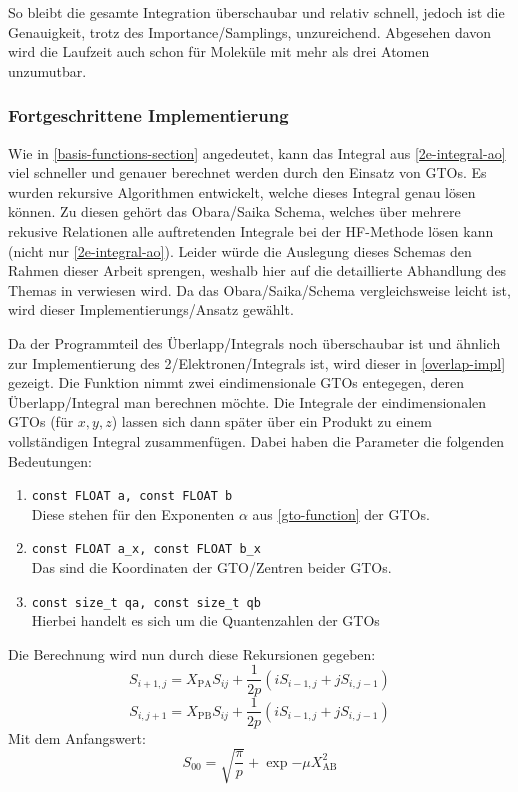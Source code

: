 So bleibt die gesamte Integration überschaubar und relativ schnell,
jedoch ist die Genauigkeit, trotz des Importance\-/Samplings, unzureichend.
Abgesehen davon wird die Laufzeit auch schon für Moleküle mit mehr als drei Atomen unzumutbar.

\subsubsection{Fortgeschrittene Implementierung}

Wie in \cref{basis-functions-section} angedeutet, kann das Integral aus \cref{2e-integral-ao}
viel schneller und genauer berechnet werden durch den Einsatz von GTOs.
Es wurden rekursive Algorithmen entwickelt, welche dieses Integral genau lösen können.
Zu diesen gehört das Obara\-/Saika Schema, welches über mehrere rekusive Relationen alle
auftretenden Integrale bei der HF-Methode lösen kann (nicht nur \cref{2e-integral-ao}).
Leider würde die Auslegung dieses Schemas den Rahmen dieser Arbeit sprengen,
weshalb hier auf die detaillierte Abhandlung des Themas in
\cite[Kapitel 9 bzw. 9.10]{structure_2013} verwiesen wird.
Da das Obara\-/Saika\-/Schema vergleichsweise leicht ist, wird dieser Implementierungs\-/Ansatz 
gewählt.

Da der Programmteil des Überlapp\-/Integrals noch überschaubar ist und ähnlich zur Implementierung
des 2\-/Elektronen\-/Integrals ist, wird dieser in \cref{overlap-impl} gezeigt. Die Funktion nimmt
zwei eindimensionale GTOs entegegen, deren Überlapp\-/Integral man berechnen möchte.
Die Integrale der eindimensionalen GTOs (für $x,y,z$) lassen sich dann später über ein Produkt
zu einem vollständigen Integral zusammenfügen. Dabei haben die Parameter die folgenden Bedeutungen:
\begin{enumerate}
    \item \texttt{const FLOAT a, const FLOAT b}\\
    Diese stehen für den Exponenten $\alpha$ aus \cref{gto-function} der GTOs.
    \item \texttt{const FLOAT a_x, const FLOAT b_x}\\
    Das sind die Koordinaten der GTO\-/Zentren beider GTOs.
    \item \texttt{const size_t qa, const size_t qb}\\
    Hierbei handelt es sich um die Quantenzahlen der GTOs
\end{enumerate}

Die Berechnung wird nun durch diese Rekursionen gegeben:
\begin{equation}
    S_{i+1,j} = X_\text{PA}S_{ij} + \frac{1}{2p}(iS_{i-1,j} + jS_{i,j-1})
\end{equation}
\begin{equation}
    S_{i,j+1} = X_\text{PB}S_{ij} + \frac{1}{2p}(iS_{i-1,j} + jS_{i,j-1})
\end{equation}
Mit dem Anfangswert:
\begin{equation}
    S_{00} = \sqrt{\frac{\pi}{p}} + \exp{-\mu X^2_\text{AB}}
\end{equation}

